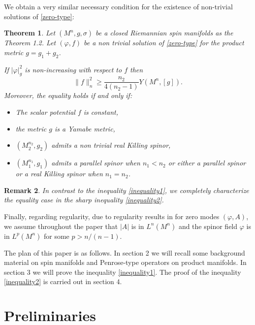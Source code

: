 \documentclass[11pt]{amsart}
\newtheorem{theorem}{Theorem}[section]
\theoremstyle{plain}
\newtheorem{remark}[theorem]{Remark}
\numberwithin{equation}{section}
\theoremstyle{plain}
\begin{document}
We obtain a very similar necessary condition for the existence of non-trivial solutions of \eqref{zero-type}:

\begin{theorem}
Let $(M^n,g,\sigma)$ be a closed Riemannian spin manifolds as the Theorem 1.2. Let $(\varphi,f)$ be a non trivial solution of \eqref{zero-type} for the product metric $g=g_1+g_2$.

If $|\varphi|_g^2$ is non-increasing with respect to $f$ then
\begin{equation}\label{inequality2}
\parallel f\parallel_n^2\geq \frac{n_2}{4(n_2-1)}Y(M^n,[g]).
\end{equation}
Moreover, the equality holds if and only if:
\begin{itemize}
\item [(a)] The scalar potential $f$ is constant,
\item [(b)] the metric $g$ is a Yamabe metric,
\item [(c)] $(M_2^{n_2},g_2)$ admits a non trivial real Killing spinor,
\item [(d)] $(M_1^{n_1},g_1)$ admits a parallel spinor when $n_1<n_2$
or either a parallel spinor or a real Killing spinor when $n_1=n_2$.
\end{itemize}
\end{theorem}

\begin{remark}
In contrast to the inequality \eqref{inequality1}, we completely characterize the equality case in the sharp inequality \eqref{inequality2}. 
\end{remark}

Finally, regarding regularity, due to regularity results in \cite{Frank-Loss1,Frank-Loss2,Wang} for zero modes $(\varphi,A)$, we assume throughout the paper that $|A|$ is in $L^n(M^n)$ and the spinor field $\varphi$ is in $L^p(M^n)$ for some $p>n/(n-1)$. 


The plan of this paper is as follows. In section 2 we will recall some background material on spin manifolds and Penrose-type operators on product manifolds. In section 3 we will prove the inequality \eqref{inequality1}. The proof of the inequality \eqref{inequality2} is carried out in section 4. 




\section{Preliminaries}
\end{document}
